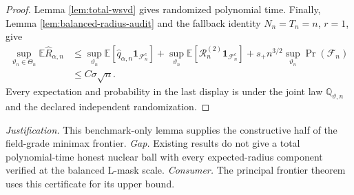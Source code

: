 \documentclass{article}
\begin{document}
\begin{proof}
Lemma \ref{lem:total-wsvd} gives randomized polynomial time.  Finally, Lemma \ref{lem:balanced-radius-audit} and the fallback identity \(N_n=T_n=n\), \(r=1\), give
\[
\begin{aligned}
\sup_{\vartheta_n\in\Theta_n}\mathbb E\widehat R_{\alpha,n}
&\le
\sup_{\vartheta_n}\mathbb E[
\widehat q_{\alpha,n}\mathbf1_{\mathcal F_n^c}]
+\sup_{\vartheta_n}\mathbb E[
\mathscr R_n^{(2)}\mathbf1_{\mathcal F_n^c}]
+s_+n^{3/2}\sup_{\vartheta_n}\Pr(\mathcal F_n)\\
&\le C\sigma\sqrt n.
\end{aligned}
\]
Every expectation and probability in the last display is under the joint law \(\mathbb Q_{\vartheta,n}\) and the declared independent randomization.
\end{proof}
\par\smallskip\noindent \textit{Justification.} This benchmark-only lemma supplies the constructive half of the field-grade minimax frontier. \textit{Gap.} Existing results do not give a total polynomial-time honest nuclear ball with every expected-radius component verified at the balanced L-mask scale. \textit{Consumer.} The principal frontier theorem uses this certificate for its upper bound.
\end{document}
